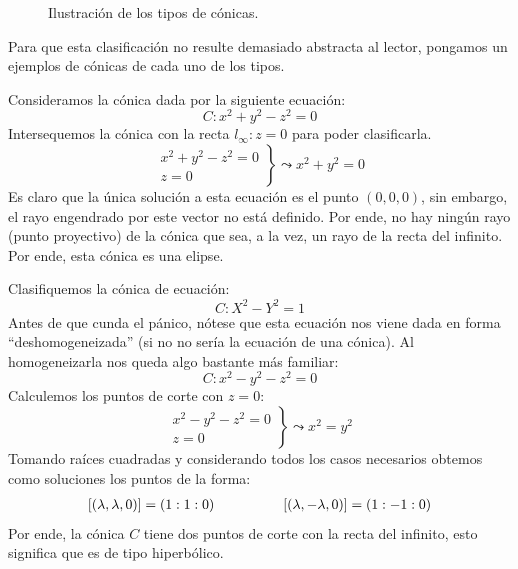 \begin{figure}[h]
	\caption{Ilustración de los tipos de cónicas.}
	\label{C7_img_tiposConicas}
\end{figure}
Para que esta clasificación no resulte demasiado abstracta al lector, pongamos un ejemplos de cónicas de cada uno de los tipos.
\begin{exa}[Elipse]
	\label{C8_exa_elipse}
	Consideramos la cónica dada por la siguiente ecuación:
	\[C:x^2+y^2-z^2=0\]
	Intersequemos la cónica con la recta $l_\infty:z=0$ para poder clasificarla.
	\[\left.\begin{array}{c}
	x^2+y^2-z^2=0\\
	z=0
	\end{array}\right\}\leadsto x^2+y^2=0\]
	Es claro que la única solución a esta ecuación es el punto $(0,0,0)$, sin embargo, el rayo engendrado por este vector no está definido. Por ende, no hay ningún rayo (punto proyectivo) de la cónica que sea, a la vez, un rayo de la recta del infinito. Por ende, esta cónica es una elipse.
\end{exa}
\begin{exa}[Hipérbola]
	Clasifiquemos la cónica de ecuación:
	\[C:X^2-Y^2=1\]
	Antes de que cunda el pánico, nótese que esta ecuación nos viene dada en forma ``deshomogeneizada'' (si no no sería la ecuación de una cónica). Al homogeneizarla nos queda algo bastante más familiar:
	\[C:x^2-y^2-z^2=0\]
	Calculemos los puntos de corte con $z=0$:
	\[\left.\begin{array}{c}
	x^2-y^2-z^2=0\\
	z=0
	\end{array}\right\}\leadsto x^2=y^2\]
	Tomando raíces cuadradas y considerando todos los casos necesarios obtemos como soluciones los puntos de la forma:
	\[\begin{array}{cc}
	\left [ (\lambda,\lambda,0) \right ]=(1:1:0)\qquad & \qquad \left [ (\lambda,-\lambda,0) \right ]=(1:-1:0)
	\end{array}\]
	Por ende, la cónica $C$ tiene dos puntos de corte con la recta del infinito, esto significa que es de tipo hiperbólico.
\end{exa}
